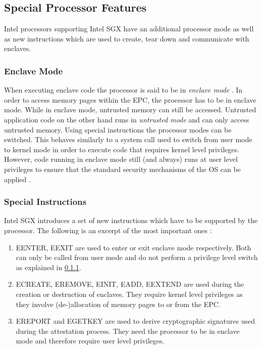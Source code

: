 \subsection{Special Processor Features}
Intel processors supporting Intel SGX have an additional processor mode as well as new instructions which are used to create, tear down and communicate with enclaves.

\subsubsection{Enclave Mode}
\label{sec:EnclaveMode}
When executing enclave code the processor is said to be in \textit{enclave mode} \cite{Costan2016IntelSE}. In order to access memory pages within the EPC, the processor has to
be in enclave mode. While in enclave mode, untrusted memory can still be accessed. Untrusted application code on the other hand runs in \textit{untrusted mode} and can only
access untrusted memory. Using special instructions the processor modes can be switched. This behaves similarly to a system call used to switch from user mode to kernel mode in 
order to execute code that requires kernel level privileges. However, code running in enclave mode still (and always) runs at user level privileges to ensure that the standard 
security mechanisms of the OS can be applied \cite{Costan2016IntelSE}.

\subsubsection{Special Instructions}
\label{sec:Instructions}
Intel SGX introduces a set of new instructions which have to be supported by the processor. The following is an excerpt of the most important ones \cite{OverviewOfIntelSGX}:
\begin{enumerate}
    \item EENTER, EEXIT are used to enter or exit enclave mode respectively. Both can only be called from user mode and do not perform a privilege level switch as explained
          in \cref{sec:EnclaveMode}.
    \item ECREATE, EREMOVE, EINIT, EADD, EEXTEND are used during the creation or destruction of enclaves. They require kernel level privileges as they involve (de-)allocation
          of memory pages to or from the EPC.
    \item EREPORT and EGETKEY are used to derive cryptographic signatures used during the attestation process. They need the processor to be in enclave mode and therefore
          require user level privileges.
\end{enumerate}